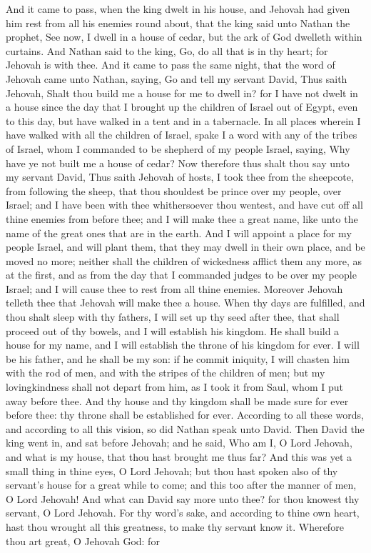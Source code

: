 And it came to pass, when the king dwelt in his house, and Jehovah had given him rest from all his enemies round about, that the king said unto Nathan the prophet, See now, I dwell in a house of cedar, but the ark of God dwelleth within curtains. And Nathan said to the king, Go, do all that is in thy heart; for Jehovah is with thee. And it came to pass the same night, that the word of Jehovah came unto Nathan, saying, Go and tell my servant David, Thus saith Jehovah, Shalt thou build me a house for me to dwell in? for I have not dwelt in a house since the day that I brought up the children of Israel out of Egypt, even to this day, but have walked in a tent and in a tabernacle. In all places wherein I have walked with all the children of Israel, spake I a word with any of the tribes of Israel, whom I commanded to be shepherd of my people Israel, saying, Why have ye not built me a house of cedar? Now therefore thus shalt thou say unto my servant David, Thus saith Jehovah of hosts, I took thee from the sheepcote, from following the sheep, that thou shouldest be prince over my people, over Israel; and I have been with thee whithersoever thou wentest, and have cut off all thine enemies from before thee; and I will make thee a great name, like unto the name of the great ones that are in the earth. And I will appoint a place for my people Israel, and will plant them, that they may dwell in their own place, and be moved no more; neither shall the children of wickedness afflict them any more, as at the first, and as from the day that I commanded judges to be over my people Israel; and I will cause thee to rest from all thine enemies. Moreover Jehovah telleth thee that Jehovah will make thee a house. When thy days are fulfilled, and thou shalt sleep with thy fathers, I will set up thy seed after thee, that shall proceed out of thy bowels, and I will establish his kingdom. He shall build a house for my name, and I will establish the throne of his kingdom for ever. I will be his father, and he shall be my son: if he commit iniquity, I will chasten him with the rod of men, and with the stripes of the children of men; but my lovingkindness shall not depart from him, as I took it from Saul, whom I put away before thee. And thy house and thy kingdom shall be made sure for ever before thee: thy throne shall be established for ever. According to all these words, and according to all this vision, so did Nathan speak unto David.  Then David the king went in, and sat before Jehovah; and he said, Who am I, O Lord Jehovah, and what is my house, that thou hast brought me thus far? And this was yet a small thing in thine eyes, O Lord Jehovah; but thou hast spoken also of thy servant’s house for a great while to come; and this too after the manner of men, O Lord Jehovah! And what can David say more unto thee? for thou knowest thy servant, O Lord Jehovah. For thy word’s sake, and according to thine own heart, hast thou wrought all this greatness, to make thy servant know it. Wherefore thou art great, O Jehovah God: for 